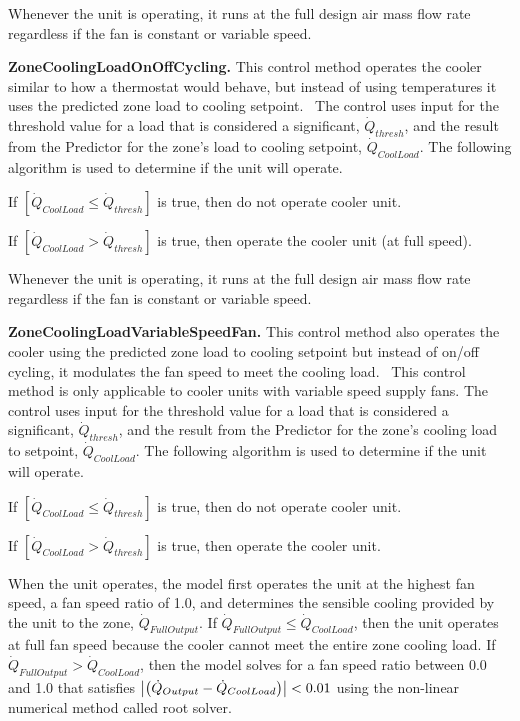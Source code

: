 Whenever the unit is operating, it runs at the full design air mass flow rate regardless if the fan is constant or variable speed.

\textbf{ZoneCoolingLoadOnOffCycling.} This control method operates the cooler similar to how a thermostat would behave, but instead of using temperatures it uses the predicted zone load to cooling setpoint.~ The control uses input for the threshold value for a load that is considered a significant, \({\dot Q_{thresh}}\), and the result from the Predictor for the zone's load to cooling setpoint, \({\dot Q_{CoolLoad}}\). The following algorithm is used to determine if the unit will operate.

If \(\left[ {{{\dot Q}_{CoolLoad}} \le {{\dot Q}_{thresh}}} \right]\) is true, then do not operate cooler unit.

If \(\left[ {{{\dot Q}_{CoolLoad}} > {{\dot Q}_{thresh}}} \right]\) is true, then operate the cooler unit (at full speed).

Whenever the unit is operating, it runs at the full design air mass flow rate regardless if the fan is constant or variable speed.

\textbf{ZoneCoolingLoadVariableSpeedFan.} This control method also operates the cooler using the predicted zone load to cooling setpoint but instead of on/off cycling, it modulates the fan speed to meet the cooling load.~ This control method is only applicable to cooler units with variable speed supply fans. The control uses input for the threshold value for a load that is considered a significant, \({\dot Q_{thresh}}\), and the result from the Predictor for the zone's cooling load to setpoint, \({\dot Q_{CoolLoad}}\). The following algorithm is used to determine if the unit will operate.

If \(\left[ {{{\dot Q}_{CoolLoad}} \le {{\dot Q}_{thresh}}} \right]\) is true, then do not operate cooler unit.

If \(\left[ {{{\dot Q}_{CoolLoad}} > {{\dot Q}_{thresh}}} \right]\) is true, then operate the cooler unit.

When the unit operates, the model first operates the unit at the highest fan speed, a fan speed ratio of 1.0, and determines the sensible cooling provided by the unit to the zone, $\dot{Q}_{FullOutput}$. If $\dot{Q}_{FullOutput} \leq \dot Q_{CoolLoad}$, then the unit operates at full fan speed because the cooler cannot meet the entire zone cooling load. If $\dot{Q}_{FullOutput} > \dot{Q}_{CoolLoad}$, then the model solves for a fan speed ratio between 0.0 and 1.0 that satisfies $\left|\PB{\dot{Q}_{Output}-\dot{Q}_{CoolLoad}}\right| < 0.01$ using the non-linear numerical method called root solver.

